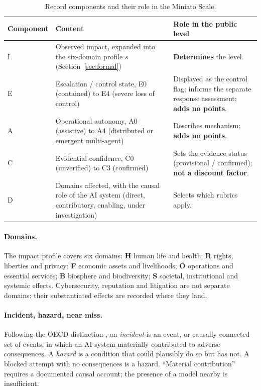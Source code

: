 \documentclass[11pt,a4paper]{article}
\begin{document}
\begin{table}[ht]
\centering\small
\caption{Record components and their role in the Miniato Scale.}
\label{tab:record}
\begin{tabularx}{\textwidth}{@{}l L{5.2cm} X@{}}
\toprule
Component & Content & Role in the public level \\
\midrule
I & Observed impact, expanded into the six-domain profile $s$ (Section~\ref{sec:formal}) & \textbf{Determines} the level. \\
E & Escalation / control state, E0 (contained) to E4 (severe loss of control) & Displayed as the control flag; informs the separate response assessment; \textbf{adds no points}. \\
A & Operational autonomy, A0 (assistive) to A4 (distributed or emergent multi-agent) & Describes mechanism; \textbf{adds no points}. \\
C & Evidential confidence, C0 (unverified) to C3 (confirmed) & Sets the evidence status (provisional / confirmed); \textbf{not a discount factor}. \\
D & Domains affected, with the causal role of the AI system (direct, contributory, enabling, under investigation) & Selects which rubrics apply. \\
\bottomrule
\end{tabularx}
\end{table}

\paragraph{Domains.} The impact profile covers six domains: \textbf{H} human life and health; \textbf{R} rights, liberties and privacy; \textbf{F} economic assets and livelihoods; \textbf{O} operations and essential services; \textbf{B} biosphere and biodiversity; \textbf{S} societal, institutional and systemic effects. Cybersecurity, reputation and litigation are not separate domains: their substantiated effects are recorded where they land.

\paragraph{Incident, hazard, near miss.} Following the OECD distinction \citep{oecd2024incidents}, an \emph{incident} is an event, or causally connected set of events, in which an AI system materially contributed to adverse consequences. A \emph{hazard} is a condition that could plausibly do so but has not. A blocked attempt with no consequences is a hazard. ``Material contribution'' requires a documented causal account; the presence of a model nearby is insufficient.
\end{document}
